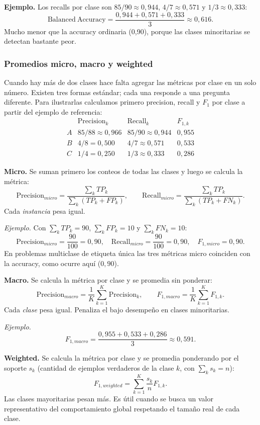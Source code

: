\documentclass[12pt,oneside]{report}
\begin{document}
\textbf{Ejemplo.} Los recalls por clase son $85/90\approx 0{,}944$,
$4/7\approx 0{,}571$ y $1/3\approx 0{,}333$:
\[
\mathrm{Balanced\ Accuracy}=\frac{0{,}944+0{,}571+0{,}333}{3}\approx 0{,}616.
\]
Mucho menor que la accuracy ordinaria (0{,}90), porque las clases
minoritarias se detectan bastante peor.

\subsubsection{Promedios micro, macro y weighted}

Cuando hay más de dos clases hace falta agregar las métricas por clase
en un solo número. Existen tres formas estándar; cada una responde a una
pregunta diferente. Para ilustrarlas calculamos primero precision,
recall y $F_1$ por clase a partir del ejemplo de referencia:
\[
\begin{array}{l|ccc}
 & \mathrm{Precision}_k & \mathrm{Recall}_k & F_{1,k} \\
\hline
A & 85/88\approx 0{,}966 & 85/90\approx 0{,}944 & 0{,}955 \\
B & 4/8 = 0{,}500        & 4/7 \approx 0{,}571  & 0{,}533 \\
C & 1/4 = 0{,}250        & 1/3 \approx 0{,}333  & 0{,}286
\end{array}
\]

\textbf{Micro.} Se suman primero los conteos de todas las clases y luego
se calcula la métrica:
\[
\mathrm{Precision}_{micro}=\frac{\sum_k TP_k}{\sum_k(TP_k+FP_k)},\qquad
\mathrm{Recall}_{micro}=\frac{\sum_k TP_k}{\sum_k(TP_k+FN_k)}.
\]
Cada \emph{instancia} pesa igual.

\emph{Ejemplo.} Con $\sum_k TP_k=90$, $\sum_k FP_k=10$ y $\sum_k FN_k=10$:
\[
\mathrm{Precision}_{micro}=\frac{90}{100}=0{,}90,\quad
\mathrm{Recall}_{micro}=\frac{90}{100}=0{,}90,\quad
F_{1,micro}=0{,}90.
\]
En problemas multiclase de etiqueta única las tres métricas micro
coinciden con la accuracy, como ocurre aquí ($0{,}90$).

\textbf{Macro.} Se calcula la métrica por clase y se promedia sin
ponderar:
\[
\mathrm{Precision}_{macro}=\frac{1}{K}\sum_{k=1}^{K}\mathrm{Precision}_k,\qquad
F_{1,macro}=\frac{1}{K}\sum_{k=1}^{K}F_{1,k}.
\]
Cada \emph{clase} pesa igual. Penaliza el bajo desempeño en clases
minoritarias.

\emph{Ejemplo.}
\[
F_{1,macro}=\frac{0{,}955+0{,}533+0{,}286}{3}\approx 0{,}591.
\]

\textbf{Weighted.} Se calcula la métrica por clase y se promedia
ponderando por el soporte $s_k$ (cantidad de ejemplos verdaderos de la
clase $k$, con $\sum_k s_k = n$):
\[
F_{1,weighted}=\sum_{k=1}^{K}\frac{s_k}{n}F_{1,k}.
\]
Las clases mayoritarias pesan más. Es útil cuando se busca un valor
representativo del comportamiento global respetando el tamaño real de
cada clase.
\end{document}
